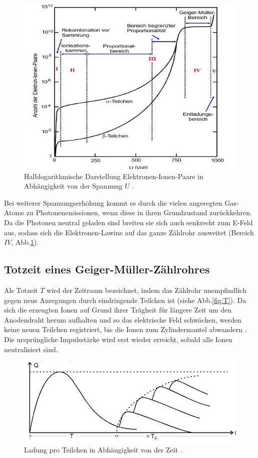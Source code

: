 \begin{figure}
\centering
\includegraphics[scale=0.5]{content/images/AU.jpg}
\caption{Halblogarithmische Darstellung Elektronen-Ionen-Paare in Abhängigkeit von der Spannung $U$ \cite{V703}.}
\label{fig:AU}
\end{figure}
Bei weiterer Spannungserhöhung kommt es durch die vielen angeregten Gas-Atome zu Photonenemissionen, wenn diese in ihren Grundzustand zurückkehren. Da die Photonen neutral geladen sind breiten sie sich auch senkrecht zum E-Feld aus, sodass sich die Elektronen-Lawine auf das ganze Zählrohr ausweitet (Bereich $IV$, Abb.\ref{fig:AU}).
\subsection{Totzeit eines Geiger-Müller-Zählrohres}
Als Totzeit $T$ wird der Zeitraum bezeichnet, indem das Zählrohr unempfindlich gegen neue Anregungen durch eindringende Teilchen ist (siehe Abb.\ref{fig:T}).
Da sich die erzeugten Ionen auf Grund ihrer Trägheit für längere Zeit um den Anodendraht herum aufhalten und so das elektrische Feld schwächen, werden keine neuen Teilchen registriert, bis die Ionen zum Zylindermantel abwandern \cite{V703}. Die ursprüngliche Impulsstärke wird erst wieder erreicht, sobald alle Ionen neutralisiert sind.\begin{figure}
\centering
\includegraphics[scale=0.5]{content/images/T.jpg}
\caption{Ladung pro Teilchen in Abhängigkeit von der Zeit \cite{V703}.}
\label{fig:TZ}
\end{figure}
